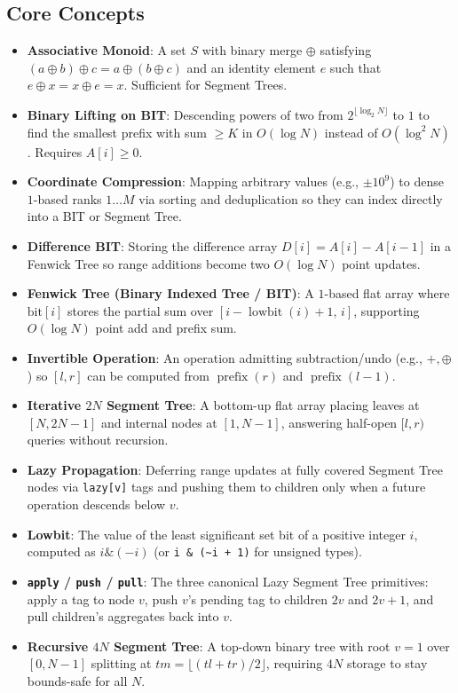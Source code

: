 \documentclass[11pt,a4paper]{article}
\theoremstyle{definition}
\begin{document}
\subsection*{Core Concepts}
\begin{itemize}[itemsep=3pt]
    \item \textbf{Associative Monoid}: A set $S$ with binary merge $\oplus$ satisfying $(a \oplus b) \oplus c = a \oplus (b \oplus c)$ and an identity element $e$ such that $e \oplus x = x \oplus e = x$. Sufficient for Segment Trees.
    \item \textbf{Binary Lifting on BIT}: Descending powers of two from $2^{\lfloor \log_2 N \rfloor}$ to $1$ to find the smallest prefix with sum $\ge K$ in $O(\log N)$ instead of $O(\log^2 N)$. Requires $A[i] \ge 0$.
    \item \textbf{Coordinate Compression}: Mapping arbitrary values (e.g., $\pm 10^9$) to dense $1$-based ranks $1 \dots M$ via sorting and deduplication so they can index directly into a BIT or Segment Tree.
    \item \textbf{Difference BIT}: Storing the difference array $D[i] = A[i] - A[i-1]$ in a Fenwick Tree so range additions become two $O(\log N)$ point updates.
    \item \textbf{Fenwick Tree (Binary Indexed Tree / BIT)}: A $1$-based flat array where $\text{bit}[i]$ stores the partial sum over $[i - \operatorname{lowbit}(i) + 1,\, i]$, supporting $O(\log N)$ point add and prefix sum.
    \item \textbf{Invertible Operation}: An operation admitting subtraction/undo (e.g., $+, \oplus$) so $[l, r]$ can be computed from $\operatorname{prefix}(r)$ and $\operatorname{prefix}(l - 1)$.
    \item \textbf{Iterative $2N$ Segment Tree}: A bottom-up flat array placing leaves at $[N, 2N - 1]$ and internal nodes at $[1, N - 1]$, answering half-open $[l, r)$ queries without recursion.
    \item \textbf{Lazy Propagation}: Deferring range updates at fully covered Segment Tree nodes via \texttt{lazy[v]} tags and pushing them to children only when a future operation descends below $v$.
    \item \textbf{Lowbit}: The value of the least significant set bit of a positive integer $i$, computed as $i \mathbin{\&} (-i)$ (or \texttt{i \& (\~{}i + 1)} for unsigned types).
    \item \textbf{\texttt{apply} / \texttt{push} / \texttt{pull}}: The three canonical Lazy Segment Tree primitives: apply a tag to node $v$, push $v$'s pending tag to children $2v$ and $2v+1$, and pull children's aggregates back into $v$.
    \item \textbf{Recursive $4N$ Segment Tree}: A top-down binary tree with root $v = 1$ over $[0, N - 1]$ splitting at $tm = \lfloor (tl + tr)/2 \rfloor$, requiring $4N$ storage to stay bounds-safe for all $N$.
\end{itemize}
\end{document}
